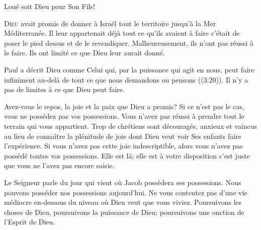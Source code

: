 Loué soit Dieu pour Son Fils! 

\dvrule







\lettrine{D}{ieu} avait promis de donner à Israël tout le territoire
 jusqu'à la Mer Méditerranée. Il leur appartenait déjà
 \ocadr tout ce qu'ils avaient à faire c'était de poser le pied dessus
 et de le revendiquer. Malheureusement, ils n'ont pas réussi à le faire.
 Ils ont limité ce que Dieu leur aurait donné. 

Paul a décrit Dieu comme \Og Celui qui, par la puissance qui agit en nous,
 peut faire infiniment au-delà de tout ce que nous demandons ou pensons \Fg{}
 ((3:20)). Il n'y a pas de limites à ce que Dieu peut faire. 


Avez-vous le repos, la joie et la paix que Dieu a promis?
 Si ce n'est pas le cas, vous ne possédez pas vos possessions.
 Vous n'avez pas réussi à prendre tout le terrain qui vous appartient.
 Trop de chrétiens sont découragés, anxieux et vaincus au lieu de connaître
 la plénitude de joie dont Dieu veut voir Ses enfants faire l'expérience.
 Si vous n'avez pas cette joie indescriptible, alors vous n'avez pas possédé
 toutes vos possessions. Elle est là; elle est à votre disposition
 \ocadr c'est juste que vous ne l'avez pas encore saisie. 

Le Seigneur parle du jour qui vient où Jacob possèdera ses possessions.
 Nous pouvons posséder nos possessions aujourd'hui.
 Ne vous contentez pas d'une vie médiocre en-dessous du niveau
 où Dieu veut que vous viviez. Poursuivons les choses de Dieu,
 poursuivons la puissance de Dieu;
 poursuivons une onction de l'Esprit de Dieu. 

